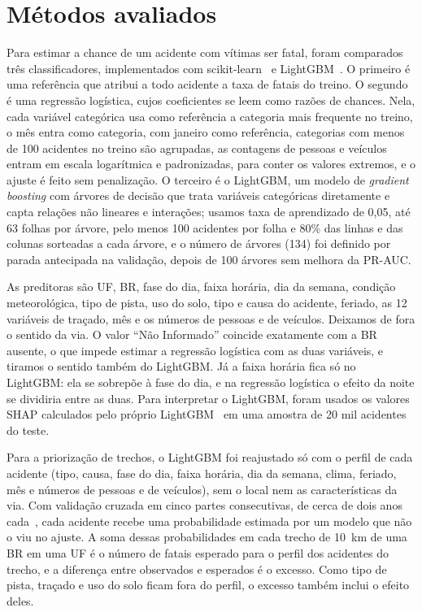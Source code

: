 \documentclass[12pt]{article}
\begin{document}
\section{Métodos avaliados}

Para estimar a chance de um acidente com vítimas ser fatal, foram comparados três classificadores, implementados com scikit-learn~\cite{sklearnlogistica} e LightGBM~\cite{lightgbm}. O primeiro é uma referência que atribui a todo acidente a taxa de fatais do treino. O segundo é uma regressão logística, cujos coeficientes se leem como razões de chances. Nela, cada variável categórica usa como referência a categoria mais frequente no treino, o mês entra como categoria, com janeiro como referência, categorias com menos de 100 acidentes no treino são agrupadas, as contagens de pessoas e veículos entram em escala logarítmica e padronizadas, para conter os valores extremos, e o ajuste é feito sem penalização. O terceiro é o LightGBM, um modelo de \textit{gradient boosting} com árvores de decisão que trata variáveis categóricas diretamente e capta relações não lineares e interações; usamos taxa de aprendizado de 0,05, até 63 folhas por árvore, pelo menos 100 acidentes por folha e 80\% das linhas e das colunas sorteadas a cada árvore, e o número de árvores (134) foi definido por parada antecipada na validação, depois de 100 árvores sem melhora da PR-AUC.

As preditoras são UF, BR, fase do dia, faixa horária, dia da semana, condição meteorológica, tipo de pista, uso do solo, tipo e causa do acidente, feriado, as 12 variáveis de traçado, mês e os números de pessoas e de veículos. Deixamos de fora o sentido da via. O valor ``Não Informado'' coincide exatamente com a BR ausente, o que impede estimar a regressão logística com as duas variáveis, e tiramos o sentido também do LightGBM. Já a faixa horária fica só no LightGBM: ela se sobrepõe à fase do dia, e na regressão logística o efeito da noite se dividiria entre as duas. Para interpretar o LightGBM, foram usados os valores SHAP calculados pelo próprio LightGBM~\cite{lightgbm} em uma amostra de 20 mil acidentes do teste.

Para a priorização de trechos, o LightGBM foi reajustado só com o perfil de cada acidente (tipo, causa, fase do dia, faixa horária, dia da semana, clima, feriado, mês e números de pessoas e de veículos), sem o local nem as características da via. Com validação cruzada em cinco partes consecutivas, de cerca de dois anos cada~\cite{sklearncv}, cada acidente recebe uma probabilidade estimada por um modelo que não o viu no ajuste. A soma dessas probabilidades em cada trecho de 10~km de uma BR em uma UF é o número de fatais esperado para o perfil dos acidentes do trecho, e a diferença entre observados e esperados é o excesso. Como tipo de pista, traçado e uso do solo ficam fora do perfil, o excesso também inclui o efeito deles.
\end{document}
